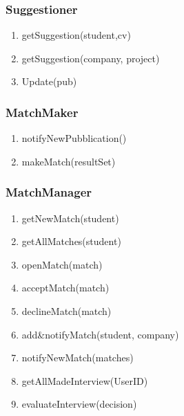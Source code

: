 \documentclass{article}
\begin{document}
\subsubsection{Suggestioner}
\begin{enumerate}
    \item getSuggestion(student,cv)
    \item getSuggestion(company, project)
    \item Update(pub)
\end{enumerate}

\subsubsection{MatchMaker}
\begin{enumerate}
    \item notifyNewPubblication()
    \item makeMatch(resultSet)
\end{enumerate}

\subsubsection{MatchManager}
\begin{enumerate}
    \item getNewMatch(student)
    \item getAllMatches(student)
    \item openMatch(match)
    \item acceptMatch(match)
    \item declineMatch(match)
    \item add\&notifyMatch(student, company)
    \item notifyNewMatch(matches)
    \item getAllMadeInterview(UserID)
    \item evaluateInterview(decision)
\end{enumerate}
\end{document}
